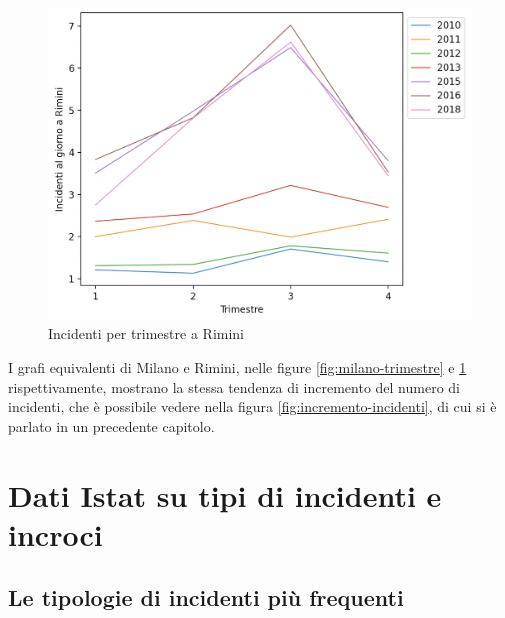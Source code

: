\documentclass[a4paper]{report}
\begin{document}
\begin{figure}
    \includegraphics[width=\linewidth]{../src/incidenti/incidenti_senza_coords/mese_incidenti/rimini_trimestre.png}
    \caption{Incidenti per trimestre a Rimini}
    \label{fig:rimini-trimestre}
\end{figure}

I grafi equivalenti di Milano e Rimini, nelle figure 
\ref{fig:milano-trimestre} e \ref{fig:rimini-trimestre} rispettivamente, 
mostrano la stessa tendenza di incremento del numero 
di incidenti, che è possibile vedere nella figura \ref{fig:incremento-incidenti}, 
di cui si è parlato in un precedente capitolo.

\section{Dati Istat su tipi di incidenti e incroci}

\subsection{Le tipologie di incidenti più frequenti}
\end{document}
